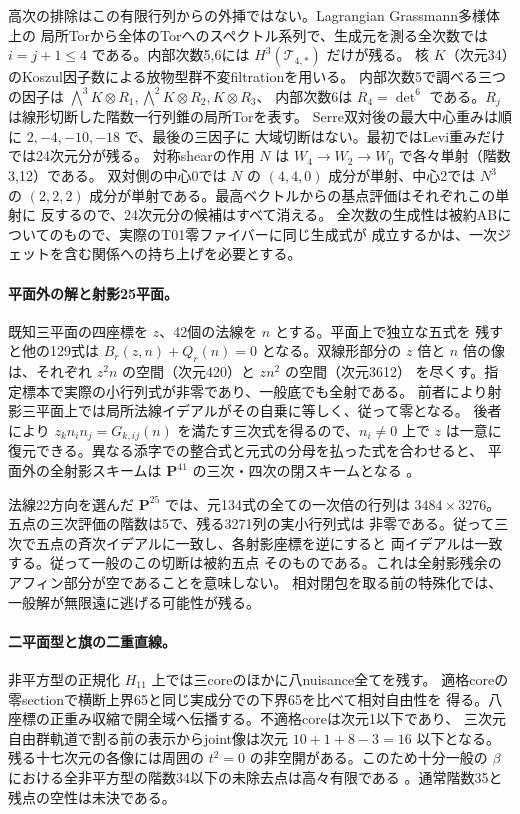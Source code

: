 \documentclass[11pt,a4paper]{ltjsarticle}
\theoremstyle{remark}
\begin{document}
高次の排除はこの有限行列からの外挿ではない。Lagrangian Grassmann多様体上の
局所Torから全体のTorへのスペクトル系列で、生成元を測る全次数では
$i=j+1\le4$ である。内部次数5,6には $H^3(\mathcal T_{4,*})$ だけが残る。
核 $K$（次元34）のKoszul因子数による放物型群不変filtrationを用いる。
内部次数5で調べる三つの因子は
$\bigwedge^3 K\otimes R_1,\bigwedge^2 K\otimes R_2,K\otimes R_3$、
内部次数6は $R_4=\det^6$ である。$R_j$ は線形切断した階数一行列錐の局所Torを表す。
Serre双対後の最大中心重みは順に $2,-4,-10,-18$ で、最後の三因子に
大域切断はない。最初ではLevi重みだけでは24次元分が残る。
対称shearの作用 $N$ は $W_4\to W_2\to W_0$ で各々単射（階数3,12）である。
双対側の中心0では $N$ の $(4,4,0)$ 成分が単射、中心2では $N^3$ の
$(2,2,2)$ 成分が単射である。最高ベクトルからの基点評価はそれぞれこの単射に
反するので、24次元分の候補はすべて消える\cite{ab-five-v55}。
全次数の生成性は被約ABについてのもので、実際のT01零ファイバーに同じ生成式が
成立するかは、一次ジェットを含む関係への持ち上げを必要とする。

\paragraph{平面外の解と射影25平面。}
既知三平面の四座標を $z$、42個の法線を $n$ とする。平面上で独立な五式を
残すと他の129式は $B_r(z,n)+Q_r(n)=0$ となる。双線形部分の $z$ 倍と
$n$ 倍の像は、それぞれ $z^2 n$ の空間（次元420）と $zn^2$ の空間（次元3612）
を尽くす。指定標本で実際の小行列式が非零であり、一般底でも全射である。
前者により射影三平面上では局所法線イデアルがその自乗に等しく、従って零となる。
後者により $z_k n_i n_j=G_{k,ij}(n)$ を満たす三次式を得るので、$n_i\ne0$ 上で
$z$ は一意に復元できる。異なる添字での整合式と元式の分母を払った式を合わせると、
平面外の全射影スキームは $\mathbf P^{41}$ の三次・四次の閉スキームとなる
\cite{affine-norm-v55}。

法線22方向を選んだ $\mathbf P^{25}$ では、元134式の全ての一次倍の行列は
$3484\times3276$。五点の三次評価の階数は5で、残る3271列の実小行列式は
非零である。従って三次で五点の斉次イデアルに一致し、各射影座標を逆にすると
両イデアルは一致する\cite{affine-p25-v55}。従って一般のこの切断は被約五点
そのものである。これは全射影残余のアフィン部分が空であることを意味しない。
相対閉包を取る前の特殊化では、一般解が無限遠に逃げる可能性が残る。

\paragraph{二平面型と旗の二重直線。}
非平方型の正規化 $H_{11}$ 上では三coreのほかに八nuisance全てを残す。
適格coreの零sectionで横断上界65と同じ実成分での下界65を比べて相対自由性を
得る。八座標の正重み収縮で開全域へ伝播する。不適格coreは次元1以下であり、
三次元自由群軌道で割る前の表示からjoint像は次元 $10+1+8-3=16$ 以下となる。
残る十七次元の各像には周囲の $t^2=0$ の非空開がある。このため十分一般の
$\beta$ における全非平方型の階数34以下の未除去点は高々有限である
\cite{binary-h11-v55}。通常階数35と残点の空性は未決である。
\end{document}
